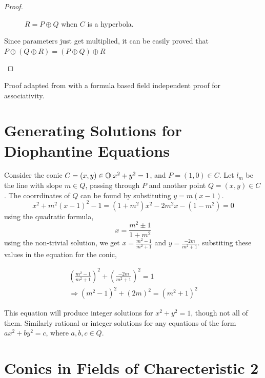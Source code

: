 \begin{proof}
\begin{itemize}
{        \begin{figure}[H]
          \center
          \caption{$R = P \oplus Q$ when $C$ is a hyperbola.}
        \end{figure}

        Since parameters just get multiplied, it can be easily proved that\\
        $P\oplus(Q\oplus R)=(P\oplus Q)\oplus R$
      }
  \end{itemize}
\end{proof}

\begin{remark}
  Proof adapted from \cite{shirali} with a formula based field independent proof for
  associativity.
\end{remark}

\section{Generating Solutions for Diophantine Equations}

Consider the conic $C={(x,y)\in\mathbb{Q}\vert x^2+y^2=1}$, and $P=(1,0)\in C$. Let $l_m$ be the line
with slope $m\in Q$, passing through $P$ and another point $Q=(x,y)\in C$. The coorrdinates
of $Q$ can be found by substituting $y=m(x-1)$.
$$x^2+m^2(x-1)^2-1=(1+m^2)x^2-2m^2x-(1-m^2)=0$$
using the quadratic formula,
$$x=\frac{m^2\pm1}{1+m^2}$$
using the non-trivial solution, we get $x=\frac{m^2-1}{m^2+1}$ and $y=\frac{-2m}{m^2+1}$.
substiting these values in the equation for the conic,

\begin{eqnarray*}
  (\frac{m^2-1}{m^2+1})^2+(\frac{-2m}{m^2+1})^2=1\\
  \Longrightarrow (m^2-1)^2+(2m)^2=(m^2+1)^2
\end{eqnarray*}

This equation will produce integer solutions for $x^2+y^2=1$, though not all of them. Similarly
rational or integer solutions for any equations of the form $ax^2+by^2=c$, where $a,b,c\in Q$.

\section{Conics in Fields of Charecteristic 2}
